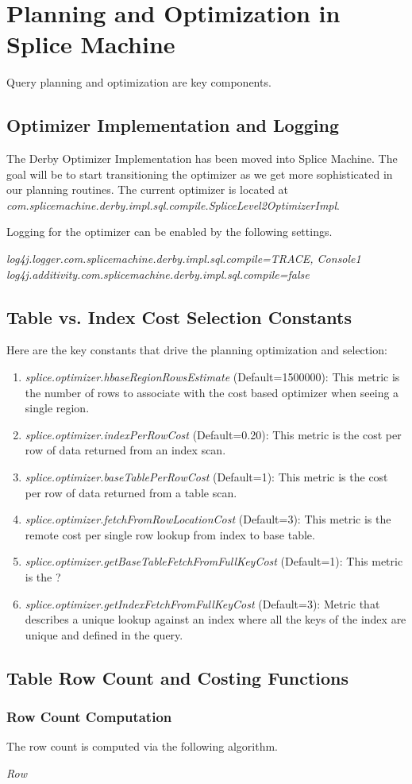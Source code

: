 \section{Planning and Optimization in Splice Machine}
Query planning and optimization are key components.

\subsection{Optimizer Implementation and Logging}

The Derby Optimizer Implementation has been moved into Splice Machine.  The goal
will be to start transitioning the optimizer as we get more sophisticated in our
planning routines.  The current optimizer is located at 
\emph{com.splicemachine.derby.impl.sql.compile.SpliceLevel2OptimizerImpl}.

Logging for the optimizer can be enabled by the following settings.

\emph{log4j.logger.com.splicemachine.derby.impl.sql.compile=TRACE, Console1}
\emph{log4j.additivity.com.splicemachine.derby.impl.sql.compile=false}

\subsection{Table vs. Index Cost Selection Constants}

Here are the key constants that drive the planning optimization and selection:

\begin{enumerate}
	\item \emph{splice.optimizer.hbaseRegionRowsEstimate} (Default=1500000): This
	metric is the number of rows to associate with the cost based optimizer when seeing a single
	region.  
	\item \emph{splice.optimizer.indexPerRowCost} (Default=0.20): This
	metric is the cost per row of data returned from an index scan. 
	\item \emph{splice.optimizer.baseTablePerRowCost} (Default=1): This
	metric is the cost per row of data returned from a table scan. 
	\item \emph{splice.optimizer.fetchFromRowLocationCost} (Default=3): This
	metric is the remote cost per single row lookup from index to base table.
	\item \emph{splice.optimizer.getBaseTableFetchFromFullKeyCost} (Default=1):
	This metric is the ?
	\item \emph{splice.optimizer.getIndexFetchFromFullKeyCost} (Default=3): Metric
	that describes a unique lookup against an index where all the keys of the
	index are unique and defined in the query.
\end{enumerate}

\subsection{Table Row Count and Costing Functions}

\subsubsection{Row Count Computation}

The row count is computed via the following algorithm.


\emph{Row }


